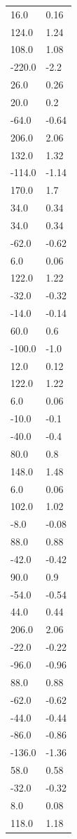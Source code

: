 \begin{longtable}{ll}
16.0 & 0.16 \\
124.0 & 1.24 \\
108.0 & 1.08 \\
-220.0 & -2.2 \\
26.0 & 0.26 \\
20.0 & 0.2 \\
-64.0 & -0.64 \\
206.0 & 2.06 \\
132.0 & 1.32 \\
-114.0 & -1.14 \\
170.0 & 1.7 \\
34.0 & 0.34 \\
34.0 & 0.34 \\
-62.0 & -0.62 \\
6.0 & 0.06 \\
122.0 & 1.22 \\
-32.0 & -0.32 \\
-14.0 & -0.14 \\
60.0 & 0.6 \\
-100.0 & -1.0 \\
12.0 & 0.12 \\
122.0 & 1.22 \\
6.0 & 0.06 \\
-10.0 & -0.1 \\
-40.0 & -0.4 \\
80.0 & 0.8 \\
148.0 & 1.48 \\
6.0 & 0.06 \\
102.0 & 1.02 \\
-8.0 & -0.08 \\
88.0 & 0.88 \\
-42.0 & -0.42 \\
90.0 & 0.9 \\
-54.0 & -0.54 \\
44.0 & 0.44 \\
206.0 & 2.06 \\
-22.0 & -0.22 \\
-96.0 & -0.96 \\
88.0 & 0.88 \\
-62.0 & -0.62 \\
-44.0 & -0.44 \\
-86.0 & -0.86 \\
-136.0 & -1.36 \\
58.0 & 0.58 \\
-32.0 & -0.32 \\
8.0 & 0.08 \\
118.0 & 1.18 \\

\end{longtable}

